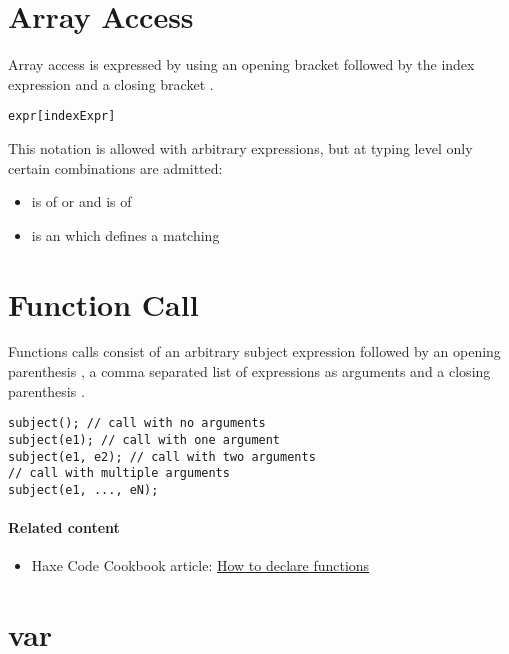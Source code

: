 \section{Array Access}
\label{expression-array-access}

Array access is expressed by using an opening bracket \expr{[} followed by the index expression and a closing bracket \expr{]}.

\begin{lstlisting}
expr[indexExpr]
\end{lstlisting}

This notation is allowed with arbitrary expressions, but at typing level only certain combinations are admitted:

\begin{itemize}
	\item {} is of  or  and  is of 
	\item {} is an  which defines a matching 
\end{itemize}


\section{Function Call}
\label{expression-function-call}

Functions calls consist of an arbitrary subject expression followed by an opening parenthesis \expr{(}, a comma \expr{,} separated list of expressions as arguments and a closing parenthesis \expr{)}.

\begin{lstlisting}
subject(); // call with no arguments
subject(e1); // call with one argument
subject(e1, e2); // call with two arguments
// call with multiple arguments
subject(e1, ..., eN);
\end{lstlisting}


\paragraph{Related content}
\begin{itemize}
	\item Haxe Code Cookbook article: \href{http://code.haxe.org/category/beginner/declare-functions.html}{How to declare functions}
\end{itemize}


\section{var}
\label{expression-var}

